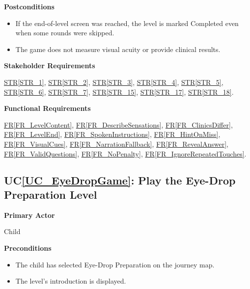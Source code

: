 \documentclass[10pt]{article}
\newcommand{\strref}[1]{\hyperref[#1]{STR\ref*{#1}}}
\newcounter{ucnum} %
\newcommand{\ucheading}[1]{UC\ref*{#1}}
\newcommand{\rref}[1]{\hyperref[#1]{FR\ref*{#1}}}
\begin{document}
\textbf{Postconditions}
\begin{itemize}
    \item If the end-of-level screen was reached, the level is
    marked Completed even when some rounds were skipped.
    \item The game does not measure visual acuity or provide
    clinical results.
\end{itemize}

\textbf{Stakeholder Requirements}

\strref{STR_1}, \strref{STR_2}, \strref{STR_3}, \strref{STR_4}, \strref{STR_5}, \strref{STR_6}, \strref{STR_7}, \strref{STR_15}, \strref{STR_17}, \strref{STR_18}.

\textbf{Functional Requirements}

\rref{FR_LevelContent}, \rref{FR_DescribeSensations}, \rref{FR_ClinicsDiffer}, \rref{FR_LevelEnd}, \rref{FR_SpokenInstructions}, \rref{FR_HintOnMiss}, \rref{FR_VisualCues}, \rref{FR_NarrationFallback}, \rref{FR_RevealAnswer}, \rref{FR_ValidQuestions}, \rref{FR_NoPenalty}, \rref{FR_IgnoreRepeatedTouches}.

\label{UC_EyeDropGame}
\subsection{\ucheading{UC_EyeDropGame}: Play the Eye-Drop Preparation Level}

\textbf{Primary Actor}

Child

\textbf{Preconditions}
\begin{itemize}
    \item The child has selected Eye-Drop Preparation on the journey map.
    \item The level's introduction is displayed.
\end{itemize}
\end{document}
